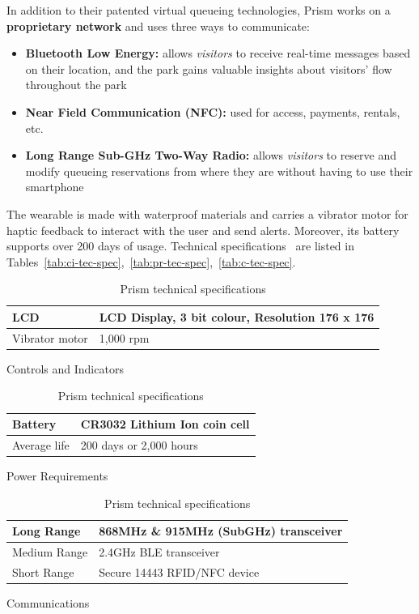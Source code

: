 In addition to their patented virtual queueing technologies, Prism works on a \textbf{proprietary network} and uses three ways to communicate:
\begin{itemize}
	\item \textbf{Bluetooth Low Energy:} allows \textit{visitors} to receive real-time messages based on their location, and the park gains valuable insights about visitors' flow throughout the park
	\item \textbf{Near Field Communication (NFC):} used for access, payments, rentals, etc.
	\item \textbf{Long Range Sub-GHz Two-Way Radio:} allows \textit{visitors} to reserve and modify queueing reservations from where they are without having to use their smartphone
\end{itemize}

The wearable is made with waterproof materials and carries a vibrator motor for haptic feedback to interact with the user and send alerts.
Moreover, its battery supports over 200 days of usage.
Technical specifications~\cite{prism-manual} are listed in Tables~\ref{tab:ci-tec-spec},~\ref{tab:pr-tec-spec},~\ref{tab:c-tec-spec}.

\begin{table}[H]
	\centering
	\begin{subtable}[t]{0.85\textwidth}
		\centering
		\begin{tabular}{|l|l|}
			\hline
			LCD            & LCD Display, 3 bit colour, Resolution 176 x 176 \\ \hline
			Vibrator motor & 1,000 rpm                                       \\
			\hline
		\end{tabular}
		\caption{Controls and Indicators}
		\label{tab:ci-tec-spec}
	\end{subtable}
	\begin{subtable}[t]{0.85\textwidth}
		\centering
		\begin{tabular}{|l|l|}
			\hline
			Battery      & CR3032 Lithium Ion coin cell \\ \hline
			Average life & 200 days or 2,000 hours      \\
			\hline
		\end{tabular}
		\caption{Power Requirements}
		\label{tab:pr-tec-spec}
	\end{subtable}
	\begin{subtable}[t]{0.85\textwidth}
		\centering
		\begin{tabular}{|l|l|}
			\hline
			Long Range   & 868MHz \& 915MHz (SubGHz) transceiver \\ \hline
			Medium Range & 2.4GHz BLE transceiver                \\ \hline
			Short Range  & Secure 14443 RFID/NFC device          \\
			\hline
		\end{tabular}
		\caption{Communications}
		\label{tab:c-tec-spec}
	\end{subtable}
	\caption{Prism technical specifications}
	\label{tab:prism-tech-spec}
\end{table}

